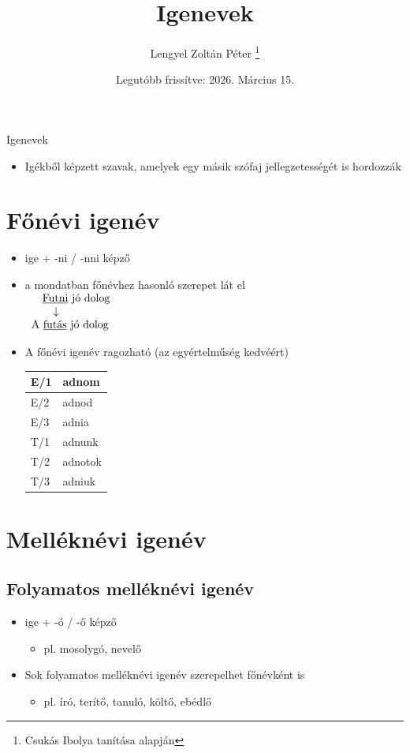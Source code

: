 \documentclass{article}
\title{Igenevek}
\author{Lengyel Zoltán Péter \thanks{Csukás Ibolya tanítása alapján}}
\date{Legutóbb frissítve: 2026. Március 15.}
\begin{document}
\maketitle
\tableofcontents
\newpage

\begin{center}
    {\Huge Igenevek}
\end{center}
\begin{itemize}
    \item Igékből képzett szavak, amelyek egy másik szófaj jellegzetességét is hordozzák
\end{itemize}

\section{Főnévi igenév}
\begin{itemize}
    \item ige + -ni / -nni képző
    \item a mondatban főnévhez hasonló szerepet lát el \\
    $\begin{array}{l}
    \quad\text{\underline{Futni} jó dolog } \\
    \quad\quad\downarrow \\
    \text{A \underline{futás} jó dolog}
    \end{array}$
    \item A főnévi igenév ragozható (az egyértelműség kedvéért) \\
    \begin{tabular}{|l|l|} \hline
        E/1 & adnom \\ \hline
        E/2 & adnod \\ \hline
        E/3 & adnia \\  \hline
        T/1 & adnunk \\ \hline
        T/2 & adnotok \\ \hline
        T/3 & adniuk \\ \hline
    \end{tabular}
\end{itemize}

\section{Melléknévi igenév}
\subsection{Folyamatos melléknévi igenév}
\begin{itemize}
    \item ige + -ó / -ő képző
    \begin{itemize}
        \item pl. mosolygó, nevelő
    \end{itemize}
    \item Sok folyamatos melléknévi igenév szerepelhet főnévként is 
    \begin{itemize}
        \item pl. író, terítő, tanuló, költő, ebédlő
    \end{itemize}
\end{itemize}
\end{document}
